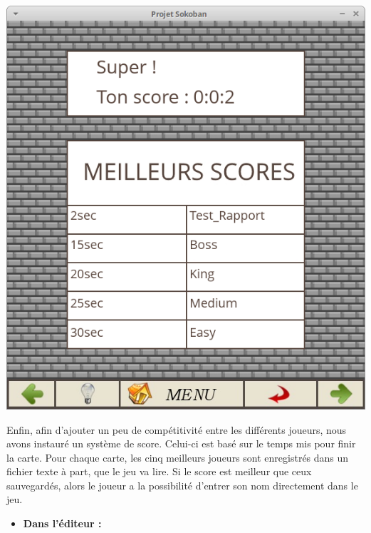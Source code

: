 \documentclass[english,11pt]{report}
\begin{document}
\begin{center}
\includegraphics[scale=0.4]{score}
\end{center}
\vspace{0.2cm}
\par
Enfin, afin d’ajouter un peu de compétitivité entre les différents joueurs, nous avons instauré un système de score. Celui-ci est basé sur le temps mis pour finir la carte. Pour chaque carte, les cinq meilleurs joueurs sont enregistrés dans un fichier texte à part, que le jeu va lire. Si le score est meilleur que ceux sauvegardés, alors le joueur a la possibilité d’entrer son nom directement dans le jeu.\par
\vspace{0.5cm}
\begin{itemize}[label=]
    \item{\textbf{Dans l'éditeur :}}
\end{itemize}
\vspace{0.5cm}
\end{document}
